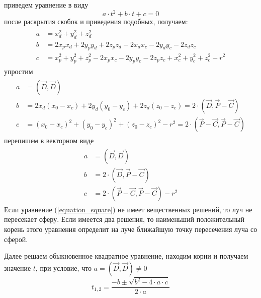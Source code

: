 \documentclass[12pt, a4paper]{article}
\begin{document}
приведем уравнение в виду
\begin{equation}
a \cdot t^2 + b \cdot t + c = 0
\label{equation_square}
\end{equation}
после раскрытия скобок и приведения подобных, получаем:
\begin{eqnarray*}
\begin{split}
a &= x^2_d + y^2_d + z^2_d \\
b &= 2x_px_d + 2 y_py_d + 2z_pz_d - 2x_dx_c - 2y_dy_c - 2z_dz_c \\
c &= x_p^2 + y_p^2 + z_p^2 - 2x_px_c - 2y_py_c - 2z_pz_c + x_c^2 + y_c^2 + z_c^2 - r^2 \end{split}
\end{eqnarray*}
упростим
\begin{eqnarray*}
\begin{split}
a &= (\vec{D}, \vec{D}) \\
b &= 2x_d(x_0 - x_c) + 2y_d(y_0 - y_c) + 2z_d(z_0 - z_c) = 2 \cdot (\vec{D}, \vec{P}-\vec{C}) \\
c &= (x_0 - x_c)^2 + (y_0 - y_c)^2 + (z_0 - z_c)^2  - r^2 = 2 \cdot (\vec{P}-\vec{C},\vec{P}-\vec{C})
\end{split}
\end{eqnarray*}
перепишем в векторном виде
\begin{eqnarray*}
\begin{split}
a &= (\vec{D}, \vec{D}) \\
b &= 2 \cdot (\vec{D}, \vec{P}-\vec{C}) \\
c &= 2 \cdot (\vec{P}-\vec{C},\vec{P}-\vec{C}) - r^2
\end{split}
\end{eqnarray*}
Если уравнение (\ref{equation_square}) не имеет вещественных решений, то луч не пересекает сферу. Если имеется два решения, то наименьший положительный корень этого уравнения определит на луче ближайшую точку пересечения луча со сферой.
\par
Далее решаем обыкновенное квадратное уравнение, находим корни и получаем значение $t$,  при условие, что $a = (\vec{D},\vec{D}) \neq 0$
$$
t_{1,2} = \frac{-b \pm \sqrt{b^2 - 4 \cdot a \cdot c}}{2 \cdot a}
$$
\end{document}
